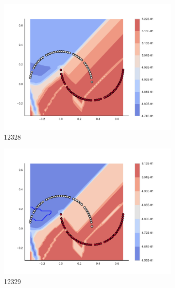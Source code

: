 \begin{figure}[h]
\begin{subfigure}[b]{0.09\textwidth}
    \includegraphics[clip, trim=2.35cm 1.75cm 4.5cm 0cm,width=\textwidth]{img/convergence/12328.pdf}
    \caption{12328}
    \label{fig:convergence_12328}
\end{subfigure}
%
\begin{subfigure}[b]{0.09\textwidth}
    \includegraphics[clip, trim=2.35cm 1.75cm 4.5cm 0cm,width=\textwidth]{img/convergence/12329.pdf}
    \caption{12329}
    \label{fig:convergence_12329}
\end{subfigure}
%
\begin{subfigure}[b]{0.09\textwidth}

\end{subfigure}
\end{figure}
